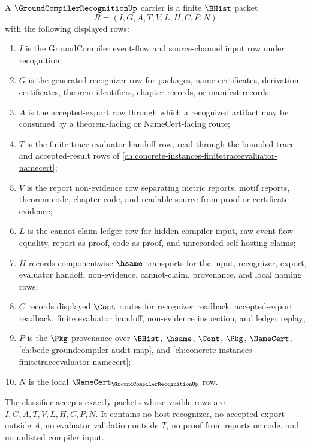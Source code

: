 \begin{definition}
\label{def:groundcompiler-recognition-carrier}
A $\GroundCompilerRecognitionUp$ carrier is a finite $\BHist$ packet
$$
R=(I,G,A,T,V,L,H,C,P,N)
$$
with the following displayed rows:
\begin{enumerate}
\item $I$ is the GroundCompiler event-flow and source-channel input row under recognition;
\item $G$ is the generated recognizer row for packages, name certificates, derivation certificates, theorem identifiers, chapter records, or manifest records;
\item $A$ is the accepted-export row through which a recognized artifact may be consumed by a theorem-facing or NameCert-facing route;
\item $T$ is the finite trace evaluator handoff row, read through the bounded trace and accepted-result rows of \autoref{ch:concrete-instances-finitetraceevaluator-namecert};
\item $V$ is the report non-evidence row separating metric reports, motif reports, theorem code, chapter code, and readable source from proof or certificate evidence;
\item $L$ is the cannot-claim ledger row for hidden compiler input, raw event-flow equality, report-as-proof, code-as-proof, and unrecorded self-hosting claims;
\item $H$ records componentwise $\hsame$ transports for the input, recognizer, export, evaluator handoff, non-evidence, cannot-claim, provenance, and local naming rows;
\item $C$ records displayed $\Cont$ routes for recognizer readback, accepted-export readback, finite evaluator handoff, non-evidence inspection, and ledger replay;
\item $P$ is the $\Pkg$ provenance over $\BHist$, $\hsame$, $\Cont$, $\Pkg$, $\NameCert$, \autoref{ch:bedc-groundcompiler-audit-map}, and \autoref{ch:concrete-instances-finitetraceevaluator-namecert};
\item $N$ is the local $\NameCert_{\GroundCompilerRecognitionUp}$ row.
\end{enumerate}
The classifier accepts exactly packets whose visible rows are $I,G,A,T,V,L,H,C,P,N$. It contains no host recognizer, no accepted export outside $A$, no evaluator validation outside $T$, no proof from reports or code, and no unlisted compiler input.
\end{definition}

